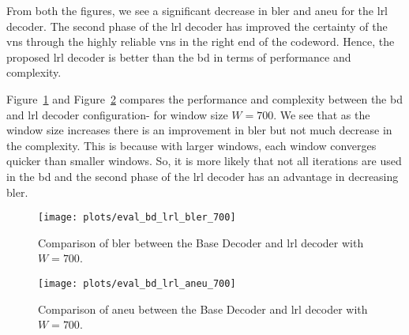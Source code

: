 From both the figures, we see a significant decrease in \gls{bler} and \gls{aneu} for the \gls{lrl} decoder. The second phase of the \gls{lrl} decoder has improved the certainty of the \glspl{vn} through the highly reliable \glspl{vn} in the right end of the codeword. Hence, the proposed \gls{lrl} decoder is better than the \gls{bd} in terms of performance and complexity.

Figure~\ref{fig:eval_bd_lrl_bler_700} and Figure~\ref{fig:eval_bd_lrl_aneu_700} compares the performance and complexity between the \gls{bd} and \gls{lrl} decoder configuration- for window size $W=700$. We see that as the window size increases there is an improvement in \gls{bler} but not much decrease in the complexity. This is because with larger windows, each window converges quicker than smaller windows. So, it is more likely that not all iterations are used in the \gls{bd} and the second phase of the \gls{lrl} decoder has an advantage in decreasing \gls{bler}. 
\begin{figure}[htbp]
  \centering
  \texttt{[image: plots/eval\_bd\_lrl\_bler\_700]}
  \caption{Comparison of \gls{bler} between the Base Decoder and \gls{lrl} decoder with $W=700$.}
  \label{fig:eval_bd_lrl_bler_700}
\end{figure}
\begin{figure}[htbp]
  \centering
  \texttt{[image: plots/eval\_bd\_lrl\_aneu\_700]}
  \caption{Comparison of \gls{aneu} between the Base Decoder and \gls{lrl} decoder with $W=700$.}
  \label{fig:eval_bd_lrl_aneu_700}
\end{figure}

